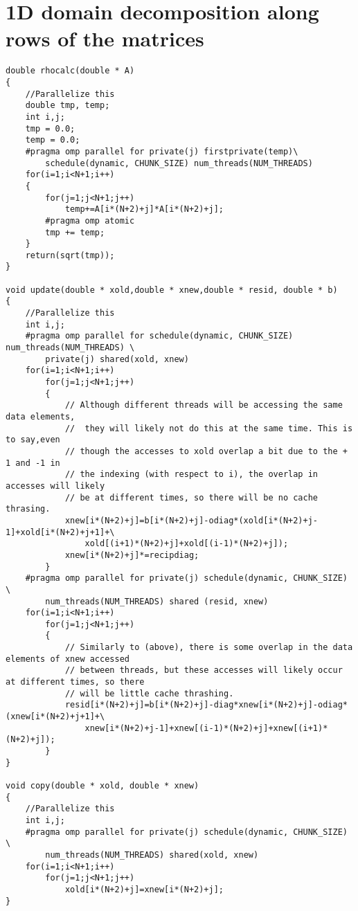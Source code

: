 \documentclass[11pt]{article}
\begin{document}
\section{1D domain decomposition along rows of the matrices}
\begin{lstlisting}
double rhocalc(double * A)
{
	//Parallelize this
	double tmp, temp;
	int i,j;
	tmp = 0.0;
	temp = 0.0;
	#pragma omp parallel for private(j) firstprivate(temp)\
		schedule(dynamic, CHUNK_SIZE) num_threads(NUM_THREADS)
	for(i=1;i<N+1;i++)
	{
		for(j=1;j<N+1;j++)
			temp+=A[i*(N+2)+j]*A[i*(N+2)+j];
		#pragma omp atomic
		tmp += temp;
	}
	return(sqrt(tmp));
}

void update(double * xold,double * xnew,double * resid, double * b)
{
	//Parallelize this
	int i,j;
	#pragma omp parallel for schedule(dynamic, CHUNK_SIZE) num_threads(NUM_THREADS) \
		private(j) shared(xold, xnew)
	for(i=1;i<N+1;i++)
		for(j=1;j<N+1;j++)
		{
			// Although different threads will be accessing the same data elements,
			//  they will likely not do this at the same time. This is to say,even
			// though the accesses to xold overlap a bit due to the + 1 and -1 in 
			// the indexing (with respect to i), the overlap in accesses will likely
			// be at different times, so there will be no cache thrasing.
			xnew[i*(N+2)+j]=b[i*(N+2)+j]-odiag*(xold[i*(N+2)+j-1]+xold[i*(N+2)+j+1]+\
				xold[(i+1)*(N+2)+j]+xold[(i-1)*(N+2)+j]);
			xnew[i*(N+2)+j]*=recipdiag;
		}
	#pragma omp parallel for private(j) schedule(dynamic, CHUNK_SIZE) \
		num_threads(NUM_THREADS) shared (resid, xnew)
	for(i=1;i<N+1;i++)
		for(j=1;j<N+1;j++)
		{
			// Similarly to (above), there is some overlap in the data elements of xnew accessed
			// between threads, but these accesses will likely occur at different times, so there 
			// will be little cache thrashing.
			resid[i*(N+2)+j]=b[i*(N+2)+j]-diag*xnew[i*(N+2)+j]-odiag*(xnew[i*(N+2)+j+1]+\
				xnew[i*(N+2)+j-1]+xnew[(i-1)*(N+2)+j]+xnew[(i+1)*(N+2)+j]);
		} 
} 
  
void copy(double * xold, double * xnew)	
{
	//Parallelize this
	int i,j;
	#pragma omp parallel for private(j) schedule(dynamic, CHUNK_SIZE) \
		num_threads(NUM_THREADS) shared(xold, xnew)
	for(i=1;i<N+1;i++)
		for(j=1;j<N+1;j++)
			xold[i*(N+2)+j]=xnew[i*(N+2)+j];
}

\end{lstlisting}
\end{document}
